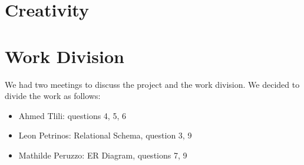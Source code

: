 \documentclass[a4paper,11pt]{article}
\begin{document}
\section{Creativity}

\section{Work Division}
We had two meetings to discuss the project and the work division. We decided to divide the work as follows:
\begin{itemize}
    \item Ahmed Tlili: questions 4, 5, 6
    \item Leon Petrinos: Relational Schema, question 3, 9
    \item Mathilde Peruzzo: ER Diagram, questions 7, 9
\end{itemize}
\end{document}
